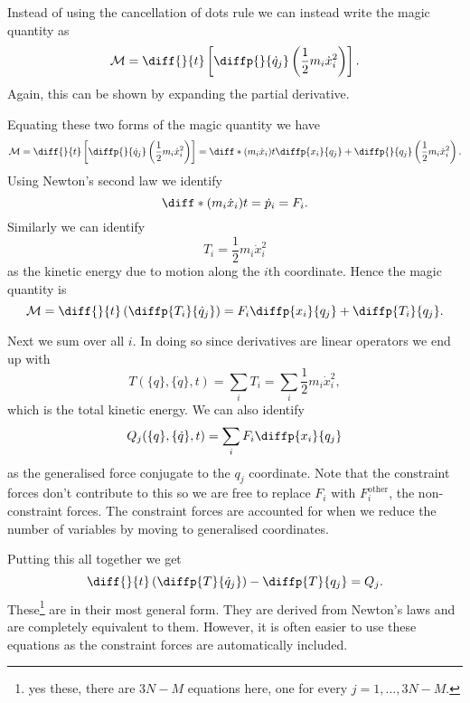 \documentclass[fleqn]{NotesClass}
\newcommand*{\other}{\mathrm{other}}
\begin{document}
    Instead of using the cancellation of dots rule we can instead write the magic quantity as
    \begin{equation}
        \mathcal{M} = \diff{}{t}\left[ \diffp{}{\dot{q}_j} \left( \frac{1}{2}m_i\dot{x}_i^2 \right) \right].
    \end{equation}
    Again, this can be shown by expanding the partial derivative.
    
    Equating these two forms of the magic quantity we have
    \begin{equation}
        \mathcal{M} = \diff{}{t}\left[ \diffp{}{\dot{q}_j} \left( \frac{1}{2}m_i\dot{x}_i^2 \right) \right] = \diff*{(m_i\dot{x}_i)}{t}\diffp{x_i}{q_j} + \diffp{}{q_j}\left( \frac{1}{2}m_i\dot{x}_i^2 \right).
    \end{equation}
    Using Newton's second law we identify
    \begin{equation}
        \diff*{(m_i\dot{x}_i)}{t} = \dot{p}_i = F_i.
    \end{equation}
    Similarly we can identify
    \begin{equation}
        T_i = \frac{1}{2}m_i\dot{x}_i^2
    \end{equation}
    as the kinetic energy due to motion along the \(i\)th coordinate.
    Hence the magic quantity is
    \begin{equation}
        \mathcal{M} = \diff{}{t}\left( \diffp{T_i}{\dot{q}_j} \right) = F_i\diffp{x_i}{q_j} + \diffp{T_i}{q_j}.
    \end{equation}
    
    Next we sum over all \(i\).
    In doing so since derivatives are linear operators we end up with 
    \begin{equation}
        T(\{q\}, \{\dot{q}\}, t) = \sum_i T_i = \sum_i \frac{1}{2}m_i\dot{x}_i^2,
    \end{equation}
    which is the total kinetic energy.
    We can also identify
    \begin{equation}
        Q_j(\{q\}, \{\dot{q}\}, t) = \sum_i F_i\diffp{x_i}{q_j}
    \end{equation}
    as the generalised force conjugate to the \(q_j\) coordinate.
    Note that the constraint forces don't contribute to this so we are free to replace \(F_i\) with \(F_i^{\other}\), the non-constraint forces.
    The constraint forces are accounted for when we reduce the number of variables by moving to generalised coordinates.
    
    Putting this all together we get
    \begin{equation}
        \diff{}{t} \left( \diffp{T}{\dot{q}_j} \right) - \diffp{T}{q_j} = Q_j.
    \end{equation}
    These\footnote{yes these, there are \(3N - M\) equations here, one for every \(j = 1, \dotsc, 3N - M\).} are  in their most general form.
    They are derived from Newton's laws and are completely equivalent to them.
    However, it is often easier to use these equations as the constraint forces are automatically included.
    
\end{document}
